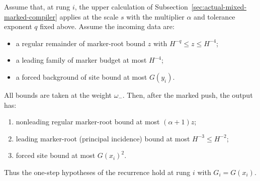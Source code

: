 \begin{lemma}
\label{lem:allarity-step-outputs}
Assume that, at rung $i$, the upper calculation of
Subsection~\ref{sec:actual-mixed-marked-compiler} applies at the scale $s$
with the multiplier $\alpha$ and tolerance exponent $q$ fixed above.
Assume the incoming data are:
\begin{itemize}
\item a regular remainder of marker-root bound $z$ with
 $H^{-q}\le z\le H^{-4}$;
\item a leading family of marker budget at most $H^{-4}$;
\item a forced background of site bound at most $G(y_i)$.
\end{itemize}
All bounds are taken at the weight $\omega_-$. Then, after the marked
push, the output has:
\begin{enumerate}
\item nonleading regular marker-root bound at most $(\alpha+1)z$;
\item leading marker-root (principal incidence) bound at most $H^{-3}\le H^{-2}$;
\item forced site bound at most $G(x_i)^2$.
\end{enumerate}
Thus the one-step hypotheses of the recurrence hold at rung $i$ with
$G_i=G(x_i)$.
\end{lemma}
